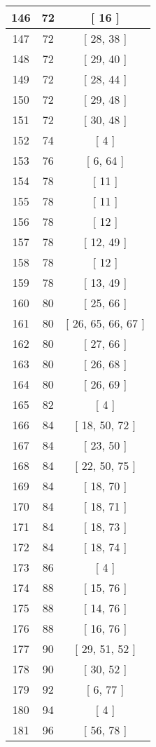 \begin{center}
\begin{longtable}[H]{|| c c c ||}
\hline
146 & 72 & [ 16 ] \\ 
\hline
147 & 72 & [ 28, 38 ] \\ 
\hline
148 & 72 & [ 29, 40 ] \\ 
\hline
149 & 72 & [ 28, 44 ] \\ 
\hline
150 & 72 & [ 29, 48 ] \\ 
\hline
151 & 72 & [ 30, 48 ] \\ 
\hline
152 & 74 & [ 4 ] \\ 
\hline
153 & 76 & [ 6, 64 ] \\ 
\hline
154 & 78 & [ 11 ] \\ 
\hline
155 & 78 & [ 11 ] \\ 
\hline
156 & 78 & [ 12 ] \\ 
\hline
157 & 78 & [ 12, 49 ] \\ 
\hline
158 & 78 & [ 12 ] \\ 
\hline
159 & 78 & [ 13, 49 ] \\ 
\hline
160 & 80 & [ 25, 66 ] \\ 
\hline
161 & 80 & [ 26, 65, 66, 67 ] \\ 
\hline
162 & 80 & [ 27, 66 ] \\ 
\hline
163 & 80 & [ 26, 68 ] \\ 
\hline
164 & 80 & [ 26, 69 ] \\ 
\hline
165 & 82 & [ 4 ] \\ 
\hline
166 & 84 & [ 18, 50, 72 ] \\ 
\hline
167 & 84 & [ 23, 50 ] \\ 
\hline
168 & 84 & [ 22, 50, 75 ] \\ 
\hline
169 & 84 & [ 18, 70 ] \\ 
\hline
170 & 84 & [ 18, 71 ] \\ 
\hline
171 & 84 & [ 18, 73 ] \\ 
\hline
172 & 84 & [ 18, 74 ] \\ 
\hline
173 & 86 & [ 4 ] \\ 
\hline
174 & 88 & [ 15, 76 ] \\ 
\hline
175 & 88 & [ 14, 76 ] \\ 
\hline
176 & 88 & [ 16, 76 ] \\ 
\hline
177 & 90 & [ 29, 51, 52 ] \\ 
\hline
178 & 90 & [ 30, 52 ] \\ 
\hline
179 & 92 & [ 6, 77 ] \\ 
\hline
180 & 94 & [ 4 ] \\ 
\hline
181 & 96 & [ 56, 78 ] \\ 

\end{longtable}
\end{center}
